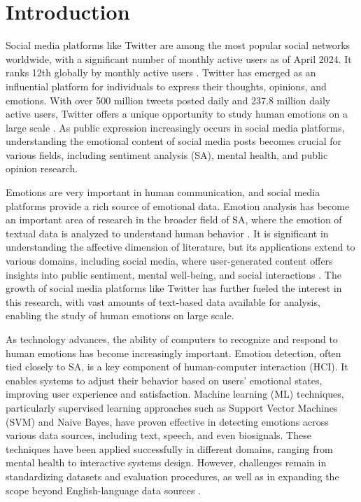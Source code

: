

\section{Introduction}



Social media platforms like Twitter are among the most popular social networks worldwide, with a significant number of monthly active users as of April 2024. It ranks 12th globally by monthly active users \cite{statistica2023}. Twitter has emerged as an influential platform for individuals to express their thoughts, opinions, and emotions. With over 500 million tweets posted daily and 237.8 million daily active users, Twitter offers a unique opportunity to study human emotions on a large scale \cite{internetlivestats2023}\cite{twitterstats2023}. As public expression increasingly occurs in social media platforms, understanding the emotional content of social media posts becomes crucial for various fields, including sentiment analysis (SA), mental health, and public opinion research.

Emotions are very important in human communication, and social media platforms provide a rich source of emotional data. Emotion analysis has become an important area of research in the broader field of SA, where the emotion of textual data is analyzed to understand human behavior \cite{Kim2019}. It is significant in understanding the affective dimension of literature, but its applications extend to various domains, including social media, where user-generated content offers insights into public sentiment, mental well-being, and social interactions \cite{Hakak2017}. The growth of social media platforms like Twitter has further fueled the interest in this research, with vast amounts of text-based data available for analysis, enabling the study of human emotions on large scale.

As technology advances, the ability of computers to recognize and respond to human emotions has become increasingly important. Emotion detection, often tied closely to SA, is a key component of human-computer interaction (HCI). It enables systems to adjust their behavior based on users' emotional states, improving user experience and satisfaction. Machine learning (ML) techniques, particularly supervised learning approaches such as Support Vector Machines (SVM) and Naive Bayes, have proven effective in detecting emotions across various data sources, including text, speech, and even biosignals. These techniques have been applied successfully in different domains, ranging from mental health to interactive systems design. However, challenges remain in standardizing datasets and evaluation procedures, as well as in expanding the scope beyond English-language data sources \cite{Alslaity2022}.
